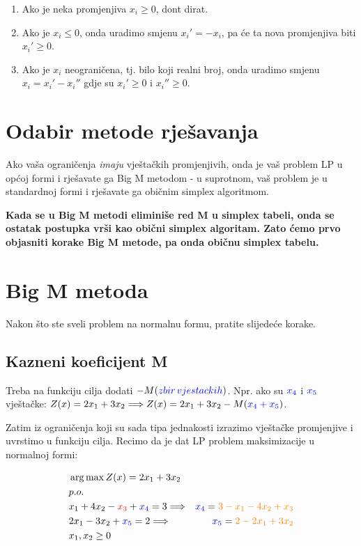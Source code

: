 \documentclass[12pt,a4paper]{article}
\begin{document}
\begin{enumerate}
    \item Ako je neka promjenjiva $x_i\geq0$, dont dirat.
    \item Ako je $x_i\leq0$, onda uradimo smjenu $x_i'=-x_i$, pa će ta nova promjenjiva biti $x_i'\geq0$.
    \item Ako je $x_i$ neograničena, tj. bilo koji realni broj, onda uradimo smjenu $x_i=x_i'-x_i''$ gdje su $x_i'\geq0$ i $ x_i''\geq0$.
\end{enumerate}


\section{Odabir metode rješavanja}

Ako vaša ograničenja \textit{imaju} vještačkih promjenjivih, onda je vaš problem LP u općoj formi i rješavate ga Big M metodom - u suprotnom, vaš problem je u standardnoj formi i rješavate ga običnim simplex algoritmom.

\textbf{Kada se u Big M metodi eliminiše red M u simplex tabeli, onda se ostatak postupka vrši kao obični simplex algoritam. Zato ćemo prvo objasniti korake Big M metode, pa onda običnu simplex tabelu.}

\section{Big M metoda}

Nakon što ste sveli problem na normalnu formu, pratite slijedeće korake. 

\subsection{Kazneni koeficijent M}

Treba na funkciju cilja dodati $-M(\textcolor{blue}{zbir\,vjestackih})$. Npr. ako su $\textcolor{blue}{x_4}$ i $\textcolor{blue}{x_5}$ vještačke: $Z(x)=2x_1+3x_2 \Longrightarrow Z(x)=2x_1+3x_2-M(\textcolor{blue}{x_4+x_5})$.

Zatim iz ograničenja koji su sada tipa jednakosti izrazimo vještačke promjenjive i uvrstimo u funkciju cilja. Recimo da je dat LP problem maksimizacije u normalnoj formi:

\begin{equation}
\begin{aligned}
    &\arg\max Z(x)=2x_1+3x_2\\
    &p.o.\\
    &x_1+4x_2-\textcolor{red}{x_3}+\textcolor{blue}{x_4}=3 \Longrightarrow&\textcolor{blue}{x_4}=\textcolor{orange}{3-x_1-4x_2+x_3}\\
    &2x_1-3x_2+\textcolor{blue}{x_5}=2 \Longrightarrow&\textcolor{blue}{x_5}=\textcolor{orange}{2-2x_1+3x_2}\\
    &x_1,x_2\geq0
\end{aligned}
\end{equation}
\end{document}
